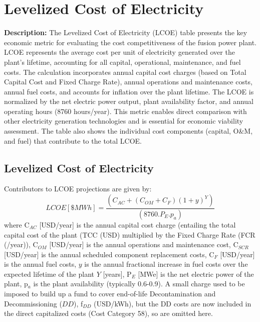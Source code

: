 
\newpage

\section{Levelized Cost of Electricity}

\textbf{Description:} The Levelized Cost of Electricity (LCOE) table presents the key economic metric for evaluating the cost competitiveness of the fusion power plant. LCOE represents the average cost per unit of electricity generated over the plant's lifetime, accounting for all capital, operational, maintenance, and fuel costs. The calculation incorporates annual capital cost charges (based on Total Capital Cost and Fixed Charge Rate), annual operations and maintenance costs, annual fuel costs, and accounts for inflation over the plant lifetime. The LCOE is normalized by the net electric power output, plant availability factor, and annual operating hours (8760 hours/year). This metric enables direct comparison with other electricity generation technologies and is essential for economic viability assessment. The table also shows the individual cost components (capital, O\&M, and fuel) that contribute to the total LCOE.

\subsection{Levelized Cost of Electricity}

 Contributors to LCOE projections are given by: 
 \begin{equation} 
 LCOE [\$ MWh] = \frac{(C_{AC} + (C_{OM} + C_{F})(1+y)^Y)}{(8760.P_E.p_a)} 
 \label{eq:coe}
\end{equation} 
where C$_{AC}$ [USD/year] is the annual capital cost charge (entailing the total capital cost of the plant (TCC (USD) multiplied by the Fixed Charge Rate (FCR (/year)), C$_{OM}$ [USD/year] is the annual operations and maintenance cost, C$_{SCR}$ [USD/year] is the annual scheduled component replacement costs, C$_{F}$ [USD/year] is the annual fuel costs, $y$ is the annual fractional increase in fuel costs over the expected lifetime of the plant $Y$ [years], P$_{E}$ [MWe] is the net electric power of the plant, p$_{a}$ is the plant availability (typically 0.6-0.9).  A small charge used to be imposed to build up a fund to cover end-of-life Decontamination and Decommissioning ($DD$), f$_{DD}$ (USD/kWh), but the DD costs are now included in the direct capitalized costs (Cost Category 58), so are omitted here.

